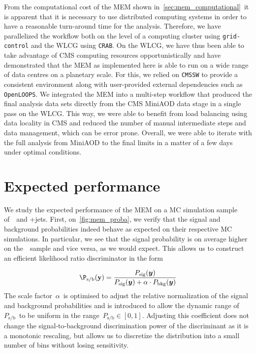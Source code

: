 From the computational cost of the MEM shown in~\cref{sec:mem_computational}~it is apparent that it is necessary to use distributed computing systems in order to have a reasonable turn-around time for the analysis. Therefore, we have parallelized the workflow both on the level of a computing cluster using \texttt{grid-control} and the WLCG using \texttt{CRAB}. On the WLCG, we have thus been able to take advantage of CMS computing resources opportunistically and have demonstrated that the MEM as implemented here is able to run on a wide range of data centres on a planetary scale. For this, we relied on \texttt{CMSSW} to provide a consistent environment along with user-provided external dependencies such as \texttt{OpenLOOPS}. We integrated the MEM into a multi-step workflow that produced the final analysis data sets directly from the CMS MiniAOD data stage in a single pass on the WLCG. This way, we were able to benefit from load balancing using data locality in CMS and reduced the number of manual intermediate steps and data management, which can be error prone. Overall, we were able to iterate with the full analysis from MiniAOD to the final limits in a matter of a few days under optimal conditions.

\section{Expected performance}
\label{sec:mem_performace}
We study the expected performance of the MEM on a MC simulation sample of~\ttHbb~and \ttbar+jets. First, on~\cref{fig:mem_proba}, we verify that the signal and background probabilities indeed behave as expected on their respective MC simulations. In particular, we see that the signal probability is on average higher on the~\ttHbb~sample and vice versa, as we would expect. This allows us to construct an efficient likelihood ratio discriminator in the form

\begin{equation}
\P_{\mathrm{s}/\mathrm{b}}(\mathbf{y}) = \frac{P_{\mathrm{sig}}(\vec{y})}{P_{\mathrm{sig}}(\vec{y}) + \alpha \cdot P_{\mathrm{bkg}}(\vec{y})}
\end{equation}
The scale factor~$\alpha$~is optimised to adjust the relative normalization of the signal and background probabilities and is introduced to allow the dynamic range of~$P_{\mathrm{s}/\mathrm{b}}$~to be uniform in the range~$P_{\mathrm{s}/\mathrm{b}} \in [0, 1]$. Adjusting this coefficient does not change the signal-to-background discrimination power of the discriminant as it is a monotonic rescaling, but allows us to discretize the distribution into a small number of bins without losing sensitivity.

